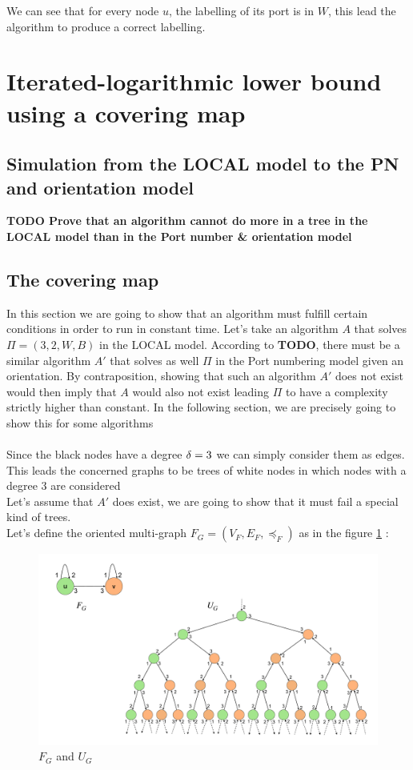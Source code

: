 We can see that for every node $u$, the labelling of its port is in $W$, this lead the algorithm to produce a correct labelling.

\section{Iterated-logarithmic lower bound using a covering map}
\subsection{Simulation from the LOCAL model to the PN and orientation model}
\textbf{TODO Prove that an algorithm cannot do more in a tree in the LOCAL model than in the Port number \& orientation model}\\
\subsection{The covering map}
In this section we are going to show that an algorithm must fulfill certain conditions in order to run in constant time.
Let's take an algorithm $A$ that solves $\Pi = (3,2,W,B)$ in the LOCAL model. According to \textbf{TODO}, there must be a similar algorithm $A'$ that solves as well $\Pi$ in the Port numbering model given an orientation. By contraposition, showing that such an algorithm $A'$ does not exist would then imply that $A$ would also not exist leading $\Pi$ to have a complexity strictly higher than constant.
In the following section, we are precisely going to show this for some algorithms\\\\

Since the black nodes have a degree $\delta = 3$ we can simply consider them as edges. This leads the concerned graphs to be trees of white nodes in which nodes with a degree 3 are considered\\
Let's assume that $A'$ does exist, we are going to show that it must fail a special kind of trees.\\
Let's define the oriented multi-graph $F_G = (V_F, E_F,\preceq_F)$ as in the figure \ref{fig:cv1} :\\
\begin{figure}[htb]
    \centering
    \includegraphics[scale = 0.22]{Figures/cover.pdf}
    \caption{$F_G$ and $U_G$}
    \label{fig:cv1}
\end{figure}

